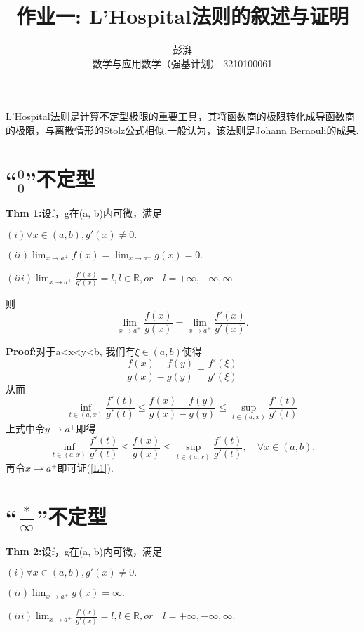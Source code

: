 \documentclass{ctexart}
\title{作业一: L'Hospital法则的叙述与证明}
\author{彭湃 \\ 数学与应用数学（强基计划） 3210100061}
\begin{document}
\maketitle

L'Hospital法则是计算不定型极限的重要工具，其将函数商的极限转化成导函数商的极限，与离散情形的Stolz公式相似.一般认为，该法则是Johann Bernouli的成果.



\section{“$\frac{0}{0}$”不定型}
\textbf{Thm 1:}设f，g在(a, b)内可微，满足

$(i)\forall x\in (a, b), g'(x)\neq0.$

$(ii)\lim_{x\rightarrow a^+} {f(x)}=\lim_{x\rightarrow a^+} {g(x)}=0.$

$(iii)\lim_{x\rightarrow a^+} {\frac{f'(x)}{g'(x)}}=l,  l\in \mathbb R, or \quad l=+\infty,-\infty, \infty.$

则
\begin{equation}
\lim_{x\rightarrow a^+} {\frac{f(x)}{g(x)}}=\lim_{x\rightarrow a^+} {\frac{f'(x)}{g'(x)}}.\label{L1}
\end{equation}

\textbf{Proof:}对于a<x<y<b, 我们有$\xi\in(a,b)$使得
\begin{equation}
\frac{f(x)-f(y)}{g(x)-g(y)}=\frac{f'(\xi)}{g'(\xi)}
\end{equation}
从而
\begin{equation}
\inf_{t\in(a,x)}\frac{f'(t)}{g'(t)}\leq\frac{f(x)-f(y)}{g(x)-g(y)}\leq\sup_{t\in(a,x)}\frac{f'(t)}{g'(t)}
\end{equation}
上式中令$y\rightarrow a^+$即得
\begin{equation}
\inf_{t\in(a,x)}\frac{f'(t)}{g'(t)}\leq\frac{f(x)}{g(x)}\leq\sup_{t\in(a,x)}\frac{f'(t)}{g'(t)}, \quad\forall x\in(a, b).
\end{equation}
再令$x\rightarrow a^+$即可证(\ref{L1}).

\section{“$\frac{*}{\infty }$”不定型}
\textbf{Thm 2:}设f，g在(a, b)内可微，满足

$(i)\forall x\in (a, b), g'(x)\neq0.$

$(ii)\lim_{x\rightarrow a^+} {g(x)}=\infty.$

$(iii)\lim_{x\rightarrow a^+} {\frac{f'(x)}{g'(x)}}=l,  l\in \mathbb R, or \quad l=+\infty,-\infty, \infty.$
\end{document}
